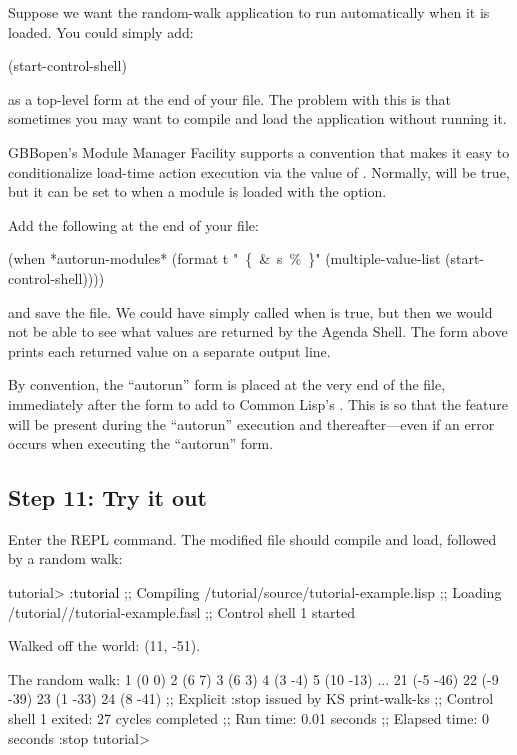 \documentclass[10pt,twoside,english,pdftex]{article}
\begin{document}
Suppose we want the random-walk application to run automatically when it is
loaded.  You could simply add:
% 
\W\supp
\begin{example}
\textcolor{darkergray}{%
  (start-control-shell)}
\end{example}
%
as a top-level form at the end of your 
file.  The problem with this is that sometimes you may want to compile and
load the application without running it.

GBBopen's Module Manager Facility supports a convention that makes it easy to
conditionalize load-time action execution via the value of
.  Normally,
 will be true, but it can be set to \nil{}
when a module is loaded with the  option.

Add the following at the end of your  file:
% 
\W\supp
\begin{example}
  (when *autorun-modules* 
    (format t "~\{~\&~s~\%~\}" (multiple-value-list (start-control-shell))))
\end{example}
%
and save the file.  We could have simply called
 when  is
true, but then we would not be able to see what values are returned by the
Agenda Shell.  The  form above prints each returned value on a
separate output line.

By convention, the ``autorun'' form is placed at the very end of the file,
immediately after the form to add  to Common Lisp's
.  This is so that the  feature will be
present during the ``autorun'' execution and thereafter---even if an error
occurs when executing the ``autorun'' form.

\subsection*{Step 11: Try it out}

Enter the  REPL command. The modified
 file should compile and load, followed by
a random walk:
%
\W\supp
\begin{example}
\textcolor{darkergray}{%
  tutorial> \textcolor{black}{:tutorial}
  ;; Compiling /tutorial/source/tutorial-example.lisp
  ;; Loading /tutorial//tutorial-example.fasl
  ;; Control shell 1 started

  Walked off the world: (11, -51).

  The random walk:
  1 (0 0)
  2 (6 7)
  3 (6 3)
  4 (3 -4)
  5 (10 -13)
     ...
  21 (-5 -46)
  22 (-9 -39)
  23 (1 -33)
  24 (8 -41)
  ;; Explicit :stop issued by KS print-walk-ks
  ;; Control shell 1 exited: 27 cycles completed
  ;; Run time: 0.01 seconds
  ;; Elapsed time: 0 seconds
  :stop
  tutorial>}
\end{example}
\end{document}
